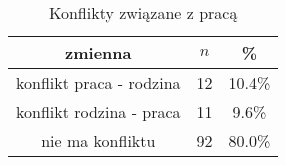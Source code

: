 \begin{table}[H]
\caption{Konflikty związane z pracą}
\centering
\begin{tabular}{ | c | c | c |}
\hline
zmienna & $n$ & \% \\
\hline
konflikt praca - rodzina  &  12  & 10.4\% \\
\hline
konflikt rodzina - praca  &  11  & 9.6\% \\
\hline
nie ma konfliktu  &  92  & 80.0\% \\
\hline
\end{tabular}
\label{tab:Q27}
\end{table}
